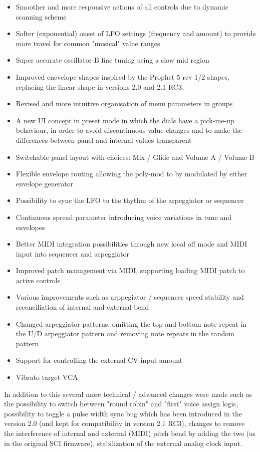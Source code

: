 \documentclass[landscape, 11pt, oneside]{report}
\newenvironment{flowtext}{\addmargin[0cm]{7cm}}{\endaddmargin} %
\begin{document}
\begin{flowtext}
\begin{itemize}
  \setlength\itemsep{0cm}
  \item Smoother and more responsive actions of all controls due to dynamic scanning scheme 
  \item Softer (exponential) onset of LFO settings (frequency and amount) to provide more travel for common "musical" value ranges
  \item Super accurate oscillator B fine tuning using a slow mid region
  \item Improved enevelope shapes inspired by the Prophet 5 rev 1/2 shapes, replacing the linear shape in versions 2.0 and 2.1 RC3.  
  \item Revised and more intuitive organisation of menu parameters in groups 
  \item A new UI concept in preset mode in which the dials have a pick-me-up behaviour, in order to avoid discontinuous value changes and to make the differences between panel and internal values transparent 
  \item Switchable panel layout with choices: Mix / Glide and Volume A / Volume B 
  \item Flexible envelope routing allowing the poly-mod to by modulated by either envelope generator
  \item Possibility to sync the LFO to the thythm of the arpeggiator or sequencer
  \item Continuous spread parameter introducing voice variations in tune and envelopes
  \item Better MIDI integration possibilities through new local off mode and MIDI input into sequencer and arpeggiator
  \item Improved patch management via MIDI, supporting loading MIDI patch to active controls 
  \item Various improvements such as arppegiator / sequencer speed stability and reconciliation of internal and external bend  
  \item Changed arpeggiator patterns: omitting the top and bottom note repeat in the U/D arpeggiator pattern and removing note repeats in the random pattern
  \item Support for controlling the external CV input amount
  \item Vibrato target VCA
\end{itemize}

In addition to this several more technical / advanced changes were made such as the possibility to switch between "round robin" and "first" voice assign logic, possibility to toggle a pulse width sync bug which has been introduced in the version 2.0 (and kept for compatibility in version 2.1 RC3), changes to remove the interference  of internal and external (MIDI) pitch bend by adding the two (as in the original SCI firmware), stabilization of the external analog clock input.


\end{flowtext}
\end{document}
